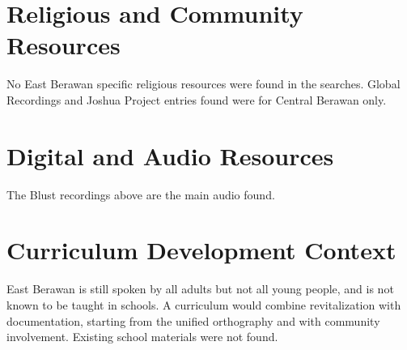 \documentclass[12pt]{article}
\begin{document}
\section{Religious and Community Resources}
No East Berawan specific religious resources were found in the searches. Global Recordings and Joshua Project entries found were for Central Berawan only.

\section{Digital and Audio Resources}
The Blust recordings above are the main audio found.

\section{Curriculum Development Context}
East Berawan is still spoken by all adults but not all young people, and is not known to be taught in schools. A curriculum would combine revitalization with documentation, starting from the unified orthography and with community involvement. Existing school materials were not found.
\end{document}
